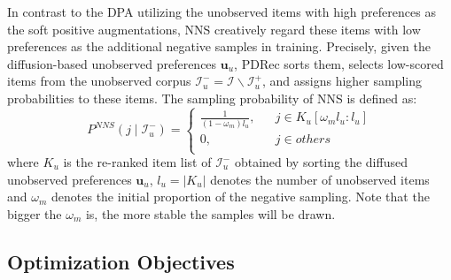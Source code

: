 \documentclass[letterpaper]{article} %
\begin{document}
In contrast to the DPA utilizing the unobserved items with high preferences as the soft positive augmentations, NNS creatively regard these items with low preferences as the additional negative samples in training. Precisely, given the diffusion-based unobserved preferences $\bm{u}_{u}$, PDRec sorts them, selects low-scored items from the unobserved corpus $\mathcal{I}^{-}_u=\mathcal{I}\backslash\mathcal{I}^{+}_u$, and assigns higher sampling probabilities to these items. The sampling probability of NNS is defined as:
\begin{equation}
 P^{N\!N\!S}(j\!\mid\!\mathcal{I}^{-}_u)\!=\!\left\{
    \begin{array}{rcl}
        \frac{1}{(1-\omega_m)l_u}, \!&&\! j \in K_u[\omega_m l_u:l_u]\\
        0,           \!&&\! j \in others\\
    \end{array} \right.
\end{equation}
where $K_u$ is the re-ranked item list of $\mathcal{I}^{-}_u$ obtained by sorting the diffused unobserved preferences $\bm{u}_{u}$, $l_u\!=\!|K_u|$ denotes the number of unobserved items and $\omega_m$ denotes the initial proportion of the negative sampling. Note that the bigger the $\omega_m$ is, the more stable the samples will be drawn.

\subsection{Optimization Objectives}
\label{sec.opt}
\end{document}

